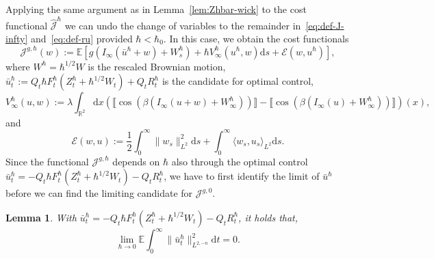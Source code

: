 \documentclass[11pt, a4paper]{scrartcl}
\numberwithin{equation}{section}
\theoremstyle{plain}
\newtheorem{lemma}[foo]{Lemma}
\theoremstyle{remark}
\newcommand{\assign}{:=}
\newcommand{\mathd}{\mathrm{d}}
\newcommand{\nobracket}{}
\begin{document}
Applying the same argument as in Lemma~\ref{lem:Zhbar-wick} to the cost
functional $\hat{\mathcal{J}}^{\hbar}$ we can undo the change of variables to
the remainder in~\eqref{eq:def-J-infty} and~\eqref{eq:def-ru} provided $\hbar
	< \hbar_0$. In this case, we obtain the cost functionals
\begin{equation}
	\mathcal{J}^{g, \hbar} (w) \assign \mathbb{E} [g (I_{\infty}
		(\bar{u}^{\hbar} + w) + W^{\hbar}_s) + \hbar V_{\infty}^{\hbar} (u^{\hbar},
		w) \mathd s \nobracket + \nobracket \mathcal{E} (w, u^{\hbar})]
	\label{eq:def-Jhbar},
\end{equation}
where $W^{\hbar} = \hbar^{1 / 2} W$ is the rescaled Brownian motion,
$\bar{u}^{\hbar}_t \assign Q_t \hbar F^{\hbar}_t (Z^{\hbar}_t + \hbar^{1 / 2}
	W_t) + Q_t R_t^{\hbar}$ is the candidate for optimal control,
\[ V_{\infty}^{\hbar} (u, w) \assign \lambda \int_{\mathbb{R}^2} \mathd x
	(\llbracket \cos (\beta (I_{\infty} (u + w) + W^{\hbar}_{\infty}))
	\rrbracket - \llbracket \cos (\beta (I_{\infty} (u) + W^{\hbar}_{\infty}))
	\rrbracket) (x), \]
and
\[ \mathcal{E} (w, u) \assign \frac{1}{2}  \int_0^{\infty} \| w_s \|^2_{L^2}
	\mathd s + \int_0^{\infty} \langle w_s, u_s \rangle_{L^2} \mathd s. \]
Since the functional $\mathcal{J}^{g,\hbar}$ depends on $\hbar$ also through the
optimal control $\bar{u}^{\hbar}_t = - Q_t \hbar F^{\hbar}_t (Z^{\hbar}_t +
	\hbar^{1 / 2} W_t) - Q_t R_t^{\hbar}$, we have to first identify the limit of
$\bar{u}^{\hbar}$ before we can find the limiting candidate for
$\mathcal{J}^{g,0}$.

\begin{lemma}
	\label{lem:uhbar-to-0}With $\bar{u}^{\hbar}_t = - Q_t \hbar F^{\hbar}_t
		(Z^{\hbar}_t + \hbar^{1 / 2} W_t) - Q_t R_t^{\hbar}$, it holds that,
	\begin{equation}
		\lim_{\hbar \rightarrow 0} \mathbb{E} \int_0^{\infty} \| \bar{u}^{\hbar}_t
		\|_{L^{2, - n}}^2 \mathd t = 0. \label{eq:uhbar-to-0}
	\end{equation}
\end{lemma}
\end{document}
